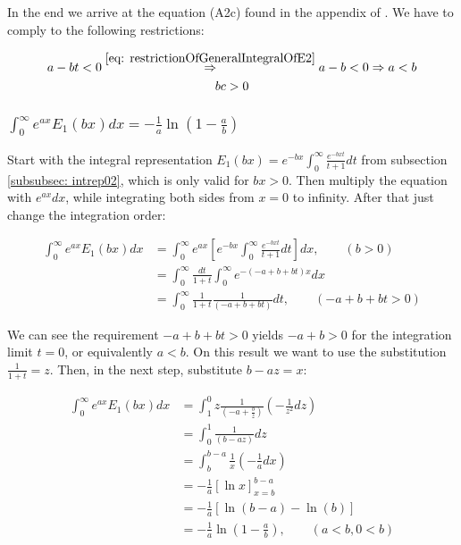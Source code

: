 \documentclass[bibliography=totocnumbered]{scrartcl}
\newcommand{\assume}[1][\text{MISSING PARAMETER}]{,\qquad\left(#1\right)}
\begin{document}
	In the end we arrive at the equation (A2c) found in the appendix of \cite{boer1990calc}. We have to comply to the following restrictions:

	\begin{subequations}
		\begin{gather}
			a-bt<0\overset{\eqref{eq: restrictionOfGeneralIntegralOfE2}}{\Rightarrow}a-b<0\Rightarrow{}a<b\\
			bc>0
		\end{gather}
	\end{subequations}

	\subsubsection[A integral of $E_1\left(x\right)$, involving the exponential function]{$\int_{0}^{\infty}e^{ax}E_1\left(bx\right)dx=-\frac{1}{a}\ln\left(1-\frac{a}{b}\right)$}
	\label{subsubsec: generalIntegralOfE3}

	Start with the integral representation $E_1\left(bx\right)=e^{-bx}\int_{0}^{\infty}\frac{e^{-bxt}}{t+1}dt$ from subsection \ref{subsubsec: intrep02}, which is only valid for $bx>0$. Then multiply the equation with $e^{ax}dx$, while integrating both sides from $x=0$ to infinity. After that just change the integration order:

	\begin{align}
		\int_{0}^{\infty}e^{ax}E_1\left(bx\right)dx&=\int_{0}^{\infty}e^{ax}\left[e^{-bx}\int_{0}^{\infty}\frac{e^{-bxt}}{t+1}dt\right]dx\assume[b>0]\\
		&=\int_{0}^{\infty}\frac{dt}{1+t}\int_{0}^{\infty}e^{-\left(-a+b+bt\right)x}dx\\
		&=\int_{0}^{\infty}\frac{1}{1+t}\frac{1}{\left(-a+b+bt\right)}dt\assume[-a+b+bt>0]
	\end{align}

	We can see the requirement $-a+b+bt>0$ yields $-a+b>0$ for the integration limit $t=0$, or equivalently $a<b$. On this result we want to use the substitution $\frac{1}{1+t}=z$. Then, in the next step, substitute $b-az=x$:

	\begin{align}
		\int_{0}^{\infty}e^{ax}E_1\left(bx\right)dx&=\int_{1}^{0}z\frac{1}{\left(-a+\frac{b}{z}\right)}\left(-\frac{1}{z^2}dz\right)\\
		&=\int_{0}^{1}\frac{1}{\left(b-az\right)}dz\\
		&=\int_{b}^{b-a}\frac{1}{x}\left(-\frac{1}{a}dx\right)\\
		&=-\frac{1}{a}\left[\ln{x}\right]^{b-a}_{x=b}\\
		&=-\frac{1}{a}\left[\ln{\left(b-a\right)}-\ln{\left(b\right)}\right]\\
		&=-\frac{1}{a}\ln{\left(1-\frac{a}{b}\right)}\assume[a<b, 0<b]\label{eq: generalIntegralOfE3}
	\end{align}
\end{document}
